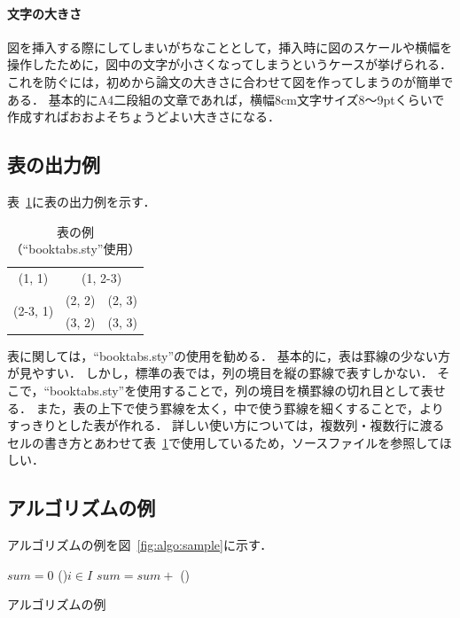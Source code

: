 \documentclass{ipsj}
\theoremstyle{definition}
\newcommand{\Fig}[1]{図~#1}
\newcommand{\Tab}[1]{表~#1}
\begin{document}
\paragraph{文字の大きさ}

図を挿入する際にしてしまいがちなこととして，挿入時に図のスケールや横幅を操作したために，図中の文字が小さくなってしまうというケースが挙げられる．
これを防ぐには，初めから論文の大きさに合わせて図を作ってしまうのが簡単である．
基本的にA4二段組の文章であれば，横幅8cm文字サイズ8～9ptくらいで作成すればおおよそちょうどよい大きさになる．



\subsection{表の出力例}

\Tab{\ref{tab:sample}}に表の出力例を示す．

\begin{table}[t]
  \caption{表の例（``booktabs.sty''使用）}
  \label{tab:sample}
  \centering \small
  \begin{tabular}{ccc}
    \toprule
    (1, 1) & \multicolumn{2}{c}{(1, 2-3)} \\
    \cmidrule(r){1-1}\cmidrule(l){2-3}
    \multirow{2}{*}{(2-3, 1)} & (2, 2) & (2, 3) \\
    & (3, 2) & (3, 3) \\
    \bottomrule
  \end{tabular}
\end{table}

表に関しては，``booktabs.sty''の使用を勧める．
基本的に，表は罫線の少ない方が見やすい．
しかし，{\LaTeXe}標準の表では，列の境目を縦の罫線で表すしかない．
そこで，``booktabs.sty''を使用することで，列の境目を横罫線の切れ目として表せる．
また，表の上下で使う罫線を太く，中で使う罫線を細くすることで，よりすっきりとした表が作れる．
詳しい使い方については，複数列・複数行に渡るセルの書き方とあわせて\Tab{\ref{tab:sample}}で使用しているため，ソースファイルを参照してほしい．



\subsection{アルゴリズムの例}

アルゴリズムの例を\Fig{\ref{fig:algo:sample}}に示す．

\begin{algorithm}[t]
  \small
  \DontPrintSemicolon
  $sum = 0$\;
  \ForEach(){$i \in I$}{
    $sum = sum +$ 
  }
  \BlankLine
  \Proc(){}{
  }
  \caption{アルゴリズムの例}
  \label{fig:algo:sample}
\end{algorithm}
\end{document}
